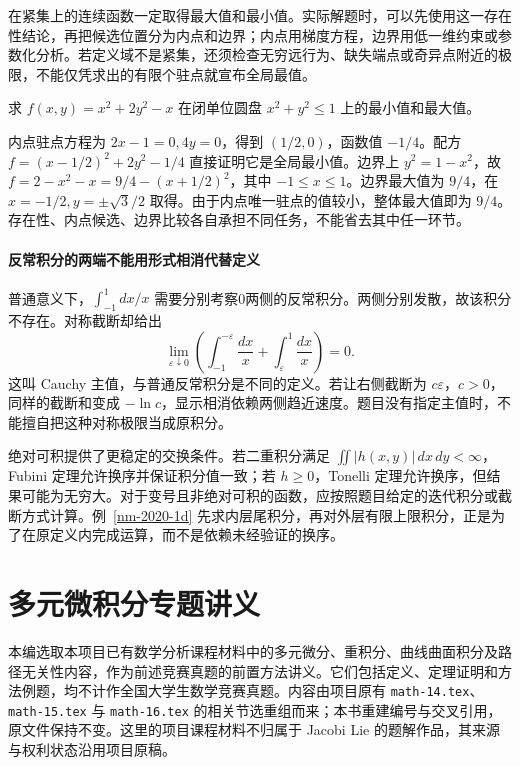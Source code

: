 \documentclass[12pt,fontset=fandol]{ctexart}
\begin{document}
在紧集上的连续函数一定取得最大值和最小值。实际解题时，可以先使用这一存在性结论，再把候选位置分为内点和边界；内点用梯度方程，边界用低一维约束或参数化分析。若定义域不是紧集，还须检查无穷远行为、缺失端点或奇异点附近的极限，不能仅凭求出的有限个驻点就宣布全局最值。

\begin{example}
求 $f(x,y)=x^2+2y^2-x$ 在闭单位圆盘 $x^2+y^2\leq1$ 上的最小值和最大值。
\end{example}
\begin{solve}
内点驻点方程为 $2x-1=0,4y=0$，得到 $(1/2,0)$，函数值 $-1/4$。配方 $f=(x-1/2)^2+2y^2-1/4$ 直接证明它是全局最小值。边界上 $y^2=1-x^2$，故 $f=2-x^2-x=9/4-(x+1/2)^2$，其中 $-1\leq x\leq1$。边界最大值为 $9/4$，在 $x=-1/2,y=\pm\sqrt3/2$ 取得。由于内点唯一驻点的值较小，整体最大值即为 $9/4$。存在性、内点候选、边界比较各自承担不同任务，不能省去其中任一环节。
\end{solve}

\subsection{反常积分的两端不能用形式相消代替定义}
普通意义下，$\int_{-1}^1dx/x$ 需要分别考察0两侧的反常积分。两侧分别发散，故该积分不存在。对称截断却给出
\[
 \lim_{\varepsilon\downarrow0}
 \left(\int_{-1}^{-\varepsilon}\frac{dx}{x}
       +\int_{\varepsilon}^1\frac{dx}{x}\right)=0.
\]
这叫 Cauchy 主值，与普通反常积分是不同的定义。若让右侧截断为 $c\varepsilon$，$c>0$，同样的截断和变成 $-\ln c$，显示相消依赖两侧趋近速度。题目没有指定主值时，不能擅自把这种对称极限当成原积分。

绝对可积提供了更稳定的交换条件。若二重积分满足 $\iint|h(x,y)|\,dx\,dy<\infty$，Fubini 定理允许换序并保证积分值一致；若 $h\geq0$，Tonelli 定理允许换序，但结果可能为无穷大。对于变号且非绝对可积的函数，应按照题目给定的迭代积分或截断方式计算。例~\ref{nm-2020-1d} 先求内层尾积分，再对外层有限上限积分，正是为了在原定义内完成运算，而不是依赖未经验证的换序。


\part{多元微积分专题讲义}

本编选取本项目已有数学分析课程材料中的多元微分、重积分、曲线曲面积分及路径无关性内容，作为前述竞赛真题的前置方法讲义。它们包括定义、定理证明和方法例题，均不计作全国大学生数学竞赛真题。内容由项目原有 \texttt{math-14.tex}、\texttt{math-15.tex} 与 \texttt{math-16.tex} 的相关节选重组而来；本书重建编号与交叉引用，原文件保持不变。这里的项目课程材料不归属于 Jacobi Lie 的题解作品，其来源与权利状态沿用项目原稿。
\end{document}
